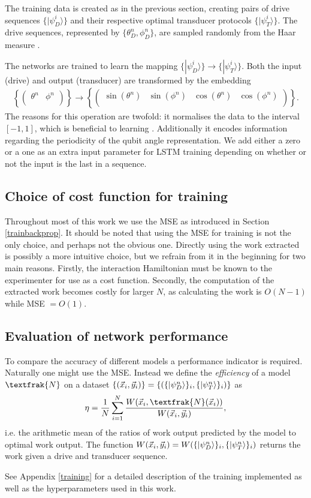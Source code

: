 The training data is created as in the previous section, creating pairs of drive sequences $\{|\psi_D^i \rangle\}$ and their respective optimal transducer protocols $\{|\psi_T^i \rangle\}$.
The drive sequences, represented by $\{\theta_D^n, \phi_D^n\}$, are sampled randomly from the Haar measure \cite{Mezzadri}.

The networks are trained to learn the mapping $\{|\psi_D^i \rangle\} \to \{|\psi_T^i \rangle\}$.
Both the input (drive) and output (transducer) are transformed by the embedding
\begin{align} \label{embedding}
	\left\{
	\begin{pmatrix}
	\theta^n & \phi^n \\
	\end{pmatrix}
	\right\}
	\to
	\left\{
	\begin{pmatrix}
	\sin(\theta^n) & \sin(\phi^n) & \cos(\theta^n)  & \cos(\phi^n) \\
	\end{pmatrix}
	\right\}.
\end{align}
The reasons for this operation are twofold: it normalises the data to the interval $[-1, 1]$, which is beneficial to learning \cite{LeCun2012}. Additionally it encodes information regarding the periodicity of the qubit angle representation.
We add either a zero or a one as an extra input parameter for LSTM training depending on whether or not the input is the last in a sequence.

\subsection{Choice of cost function for training}
Throughout most of this work we use the MSE as introduced in Section \ref{trainbackprop}.
It should be noted that using the MSE for training is not the only choice, and perhaps not the obvious one.
Directly using the work extracted is possibly a more intuitive choice, but we refrain from it in the beginning for two main reasons.
Firstly, the interaction Hamiltonian must be known to the experimenter for use as a cost function.
Secondly, the computation of the extracted work becomes costly for larger $N$, as calculating the work is $O(N-1)$ while MSE $= O(1)$.

\subsection{Evaluation of network performance}
To compare the accuracy of different models a performance indicator is required. 
Naturally one might use the MSE.
Instead we define the \textit{efficiency} of a model $\textfrak{N}$ on a dataset $\{(\vec{x}_i, \vec{y}_i)\} = \{(\{\ket{\psi_D^n}\}_i, \{\ket{\psi_T^n}\}_i) \}$ as
\begin{align}
	\eta = \frac{1}{N} \sum_{i=1}^N \frac{W(\vec{x}_i,\textfrak{N}(\vec{x}_i))}{W(\vec{x}_i,\vec{y}_i)},
\end{align}
i.e. the arithmetic mean of the ratios of work output predicted by the model to optimal work output.
The function $W(\vec{x}_i, \vec{y}_i) = W(\{\ket{\psi_D^n}\}_i, \{\ket{\psi_T^n}\}_i)$ returns the work given a drive and transducer sequence.

See Appendix \ref{training} for a detailed description of the training implemented as well as the hyperparameters used in this work.